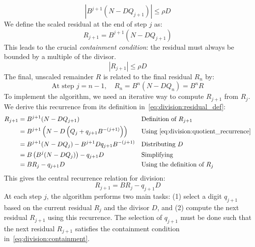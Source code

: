 \documentclass{article}
\begin{document}
\begin{equation}
  \label{eq:division:scaled_error}
  \left| B^{j+1} (N - D Q_{j+1}) \right| \leq \rho D
\end{equation}
We define the scaled residual at the end of step $j$ as:
\begin{equation}
  \label{eq:division:residual_def}
  R_{j+1} = B^{j+1} (N - D Q_{j+1})
\end{equation}
This leads to the crucial \emph{containment condition}: the residual must always be bounded by a multiple of the divisor.
\begin{equation}
  \label{eq:division:containment}
  \left| R_{j+1} \right| \leq \rho D
\end{equation}
The final, unscaled remainder $R$ is related to the final residual $R_n$ by:
\begin{equation}
  \label{eq:division:final_remainder}
  \text{At step } j = n-1, \quad R_n = B^n (N - D Q_n) = B^n R
\end{equation}
To implement the algorithm, we need an iterative way to compute $R_{j+1}$ from $R_j$.
We derive this recurrence from its definition in~\cref{eq:division:residual_def}:
\begin{align*}
  R_{j+1} &= B^{j+1} (N - D Q_{j+1}) && \text{Definition of } R_{j+1} \\
  &= B^{j+1} \left(N - D \left(Q_j + q_{j+1} B^{-(j+1)}\right)\right) && \text{Using \cref{eq:division:quotient_recurrence}} \\
  &= B^{j+1} (N - D Q_j) - B^{j+1} D q_{j+1} B^{-(j+1)} && \text{Distributing } D \\
  &= B \left(B^j (N - D Q_j)\right) - q_{j+1} D && \text{Simplifying} \\
  &= B R_j - q_{j+1} D && \text{Using the definition of } R_j
\end{align*}
This gives the central recurrence relation for division:
\begin{equation}
  \label{eq:division:residual_recurrence}
  R_{j+1} = B R_j - q_{j+1} D
\end{equation}
At each step $j$, the algorithm performs two main tasks: (1) select a digit $q_{j+1}$ based on the current residual $R_j$ and the divisor $D$, and (2) compute the next residual $R_{j+1}$ using this recurrence.
The selection of $q_{j+1}$ must be done such that the next residual $R_{j+1}$ satisfies the containment condition in~\cref{eq:division:containment}.
\end{document}
